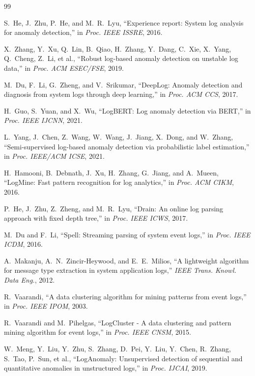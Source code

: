 \documentclass[11pt]{article}
\begin{document}

\begin{thebibliography}{99}

S.~He, J.~Zhu, P.~He, and M.~R.~Lyu,
``Experience report: System log analysis for anomaly detection,''
in \emph{Proc. IEEE ISSRE}, 2016.

X.~Zhang, Y.~Xu, Q.~Lin, B.~Qiao, H.~Zhang, Y.~Dang, C.~Xie, X.~Yang, Q.~Cheng, Z.~Li, et al.,
``Robust log-based anomaly detection on unstable log data,''
in \emph{Proc. ACM ESEC/FSE}, 2019.

M.~Du, F.~Li, G.~Zheng, and V.~Srikumar,
``DeepLog: Anomaly detection and diagnosis from system logs through deep learning,''
in \emph{Proc. ACM CCS}, 2017.

H.~Guo, S.~Yuan, and X.~Wu,
``LogBERT: Log anomaly detection via BERT,''
in \emph{Proc. IEEE IJCNN}, 2021.

L.~Yang, J.~Chen, Z.~Wang, W.~Wang, J.~Jiang, X.~Dong, and W.~Zhang,
``Semi-supervised log-based anomaly detection via probabilistic label estimation,''
in \emph{Proc. IEEE/ACM ICSE}, 2021.

H.~Hamooni, B.~Debnath, J.~Xu, H.~Zhang, G.~Jiang, and A.~Mueen,
``LogMine: Fast pattern recognition for log analytics,''
in \emph{Proc. ACM CIKM}, 2016.

P.~He, J.~Zhu, Z.~Zheng, and M.~R.~Lyu,
``Drain: An online log parsing approach with fixed depth tree,''
in \emph{Proc. IEEE ICWS}, 2017.

M.~Du and F.~Li,
``Spell: Streaming parsing of system event logs,''
in \emph{Proc. IEEE ICDM}, 2016.

A.~Makanju, A.~N.~Zincir-Heywood, and E.~E.~Milios,
``A lightweight algorithm for message type extraction in system application logs,''
\emph{IEEE Trans. Knowl. Data Eng.}, 2012.

R.~Vaarandi,
``A data clustering algorithm for mining patterns from event logs,''
in \emph{Proc. IEEE IPOM}, 2003.

R.~Vaarandi and M.~Pihelgas,
``LogCluster - A data clustering and pattern mining algorithm for event logs,''
in \emph{Proc. IEEE CNSM}, 2015.

W.~Meng, Y.~Liu, Y.~Zhu, S.~Zhang, D.~Pei, Y.~Liu, Y.~Chen, R.~Zhang, S.~Tao, P.~Sun, et al.,
``LogAnomaly: Unsupervised detection of sequential and quantitative anomalies in unstructured logs,''
in \emph{Proc. IJCAI}, 2019.


\end{thebibliography}
\end{document}
